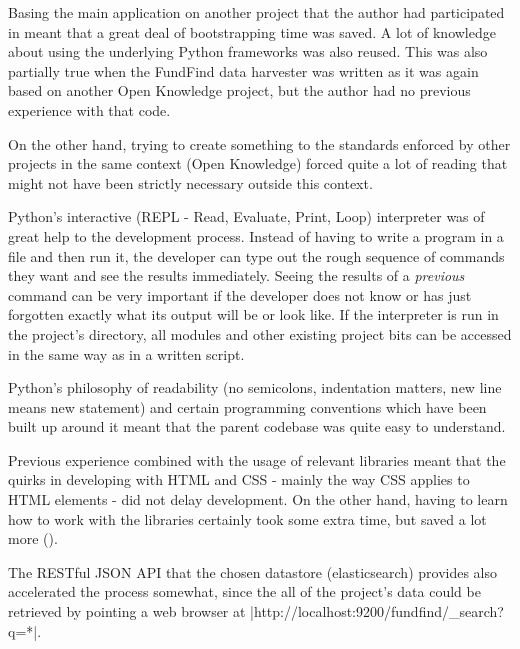 
Basing the main application on another project that the author had participated in meant that a great deal of bootstrapping time was saved. A lot of knowledge about using the underlying Python frameworks was also reused. This was also partially true when the FundFind data harvester was written as it was again based on another Open Knowledge project, but the author had no previous experience with that code.

On the other hand, trying to create something to the standards enforced by other projects in the same context (Open Knowledge) forced quite a lot of reading that might not have been strictly necessary outside this context.

Python's interactive (REPL - Read, Evaluate, Print, Loop) interpreter was of great help to the development process. Instead of having to write a program in a file and then run it, the developer can type out the rough sequence of commands they want and see the results immediately. Seeing the results of a \emph{previous} command can be very important if the developer does not know or has just forgotten exactly what its output will be or look like. If the interpreter is run in the project's directory, all modules and other existing project bits can be accessed in the same way as in a written script.

Python's philosophy of readability (no semicolons, indentation matters, new line means new statement) and certain programming conventions which have been built up around it meant that the parent codebase was quite easy to understand.

Previous experience combined with the usage of relevant libraries meant that the quirks in developing with HTML and CSS - mainly the way CSS applies to HTML elements - did not delay development. On the other hand, having to learn how to work with the libraries certainly took some extra time, but saved a lot more ().

The RESTful JSON API that the chosen datastore (elasticsearch) provides also accelerated the process somewhat, since the all of the project's data could be retrieved by pointing a web browser at |http://localhost:9200/fundfind/_search?q=*|.

